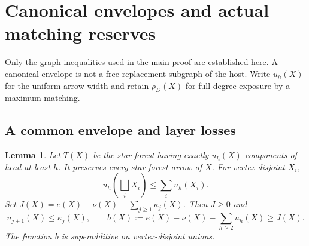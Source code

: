 \documentclass[11pt,a4paper]{article}
\newcommand{\sq}{\bigsqcup}
\newtheorem{lemma}[theorem]{Lemma}
\theoremstyle{definition}
\begin{document}
\appendix{}
\section{Canonical envelopes and actual matching reserves}\label{app:reserve}
Only the graph inequalities used in the main proof are established here. A canonical envelope is not a free replacement subgraph of the host. Write $u_h(X)$ for the uniform-arrow width and retain $\rho_D(X)$ for full-degree exposure by a maximum matching.

\subsection{A common envelope and layer losses}
\begin{lemma}\label{lem:envelope}
Let $T(X)$ be the star forest having exactly $u_h(X)$ components of head at least $h$. It preserves every star-forest arrow of $X$. For vertex-disjoint $X_i$,
\[
u_h\left(\sq_iX_i\right)\le\sum_i u_h(X_i).
\]
Set $J(X)=e(X)-\nu(X)-\sum_{j\ge1}\kappa_j(X)$. Then $J\ge0$ and
\[
u_{j+1}(X)\le\kappa_j(X),\qquad
b(X):=e(X)-\nu(X)-\sum_{h\ge2}u_h(X)\ge J(X).
\]
The function $b$ is superadditive on vertex-disjoint unions.
\end{lemma}
\end{document}
